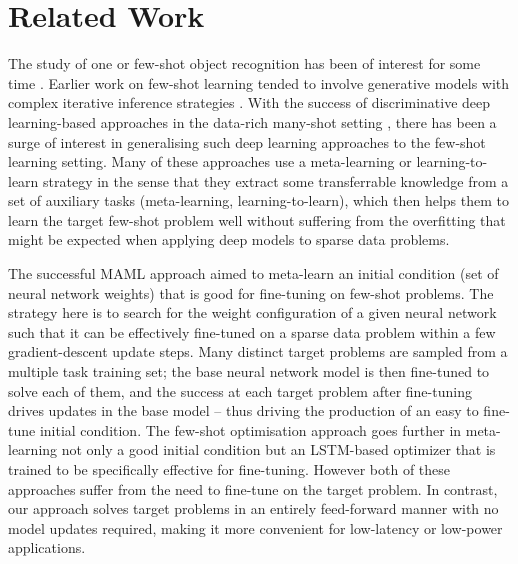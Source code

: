 \documentclass[10pt,twocolumn,letterpaper]{article}
\begin{document}
\section{Related Work}

The study of one or few-shot object recognition has been of interest for some time \cite{fei2006one}. Earlier work on few-shot learning tended to involve generative models with complex iterative inference strategies \cite{fei2006one,lake2011one}. With the success of discriminative deep learning-based approaches in the data-rich many-shot setting \cite{krizhevsky2012imagenet, he2016deep, simonyan2014very}, there has been a surge of interest in generalising  such deep learning approaches to the few-shot learning setting. Many of these approaches use a meta-learning or learning-to-learn strategy in the sense that they extract some transferrable knowledge from a set of auxiliary tasks  (meta-learning, learning-to-learn), which then helps them to learn the target few-shot problem well without suffering from the overfitting that might be expected when applying deep models to sparse data problems. 

 The successful MAML approach \cite{finn2017model} aimed to meta-learn an initial condition (set of neural network weights) that is good for fine-tuning on few-shot problems. The strategy here is to search for the weight configuration of a given neural network such that it can be effectively fine-tuned on a sparse data problem within a few gradient-descent update steps. Many distinct target problems are sampled from a multiple task training set; the base neural network model is then fine-tuned to solve each of them, and the success at each target problem after fine-tuning drives updates in the base model -- thus driving the production of an easy to fine-tune initial condition. The few-shot optimisation approach \cite{ravi2016optimization} goes further in meta-learning not only a good initial condition but an LSTM-based optimizer that is trained to be specifically effective for fine-tuning. However both of these approaches suffer from the need to fine-tune on the target problem. In contrast, our approach solves target problems in an entirely feed-forward manner with no model updates required, making it more convenient for low-latency or low-power applications. 
\end{document}

